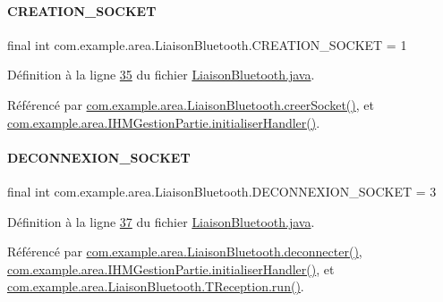 \paragraph{\texorpdfstring{C\+R\+E\+A\+T\+I\+O\+N\+\_\+\+S\+O\+C\+K\+ET}{CREATION\_SOCKET}}
{\footnotesize\ttfamily final int com.\+example.\+area.\+Liaison\+Bluetooth.\+C\+R\+E\+A\+T\+I\+O\+N\+\_\+\+S\+O\+C\+K\+ET = 1\hspace{0.3cm}{\ttfamily [static]}}



Définition à la ligne \hyperlink{_liaison_bluetooth_8java_source_l00035}{35} du fichier \hyperlink{_liaison_bluetooth_8java_source}{Liaison\+Bluetooth.\+java}.



Référencé par \hyperlink{_liaison_bluetooth_8java_source_l00102}{com.\+example.\+area.\+Liaison\+Bluetooth.\+creer\+Socket()}, et \hyperlink{_i_h_m_gestion_partie_8java_source_l00291}{com.\+example.\+area.\+I\+H\+M\+Gestion\+Partie.\+initialiser\+Handler()}.

\mbox{\label{classcom_1_1example_1_1area_1_1_liaison_bluetooth_a8ff08468d7b2cead9c3714c665f75d0e}} 
\paragraph{\texorpdfstring{D\+E\+C\+O\+N\+N\+E\+X\+I\+O\+N\+\_\+\+S\+O\+C\+K\+ET}{DECONNEXION\_SOCKET}}
{\footnotesize\ttfamily final int com.\+example.\+area.\+Liaison\+Bluetooth.\+D\+E\+C\+O\+N\+N\+E\+X\+I\+O\+N\+\_\+\+S\+O\+C\+K\+ET = 3\hspace{0.3cm}{\ttfamily [static]}}



Définition à la ligne \hyperlink{_liaison_bluetooth_8java_source_l00037}{37} du fichier \hyperlink{_liaison_bluetooth_8java_source}{Liaison\+Bluetooth.\+java}.



Référencé par \hyperlink{_liaison_bluetooth_8java_source_l00171}{com.\+example.\+area.\+Liaison\+Bluetooth.\+deconnecter()}, \hyperlink{_i_h_m_gestion_partie_8java_source_l00291}{com.\+example.\+area.\+I\+H\+M\+Gestion\+Partie.\+initialiser\+Handler()}, et \hyperlink{_liaison_bluetooth_8java_source_l00240}{com.\+example.\+area.\+Liaison\+Bluetooth.\+T\+Reception.\+run()}.

